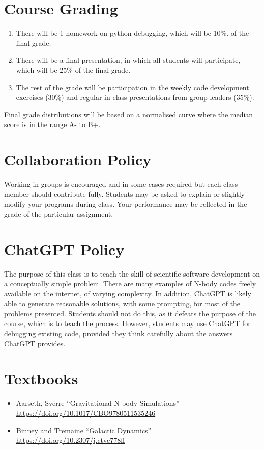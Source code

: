 \documentclass[12pt]{article}
\begin{document}
\section{Course Grading}

\begin{enumerate}
 \item There will be 1 homework on python debugging, which will be 10\%. of the final grade.
\item There will be a final presentation, in which all students will participate, which will be 25\% of the final grade.
\item The rest of the grade will be participation in the weekly code development exercises (30\%) and regular in-class presentations from group leaders (35\%).
\end{enumerate}

Final grade distributions will be based on a normalised curve where the median score is in the range A- to B+.


\section{Collaboration Policy}

Working in groups is encouraged and in some cases required but each class member should contribute fully. Students may be asked to explain or slightly modify your programs during class. Your performance may be reflected in the grade of the particular assignment.

\section{ChatGPT Policy}

The purpose of this class is to teach the skill of scientific software development on a conceptually simple problem. There are many examples of N-body codes freely available on the internet, of varying complexity. In addition, ChatGPT is likely able to generate reasonable solutions, with some prompting, for most of the problems presented. Students should not do this, as it defeats the purpose of the course, which is to teach the process. However, students may use ChatGPT for debugging existing code, provided they think carefully about the answers ChatGPT provides.

\section{Textbooks}
\begin{itemize}
\item Aarseth, Sverre ``Gravitational N-body Simulations'' \url{https://doi.org/10.1017/CBO9780511535246}

\item Binney and Tremaine ``Galactic Dynamics'' \url{https://doi.org/10.2307/j.ctvc778ff}
\end{itemize}
\end{document}
